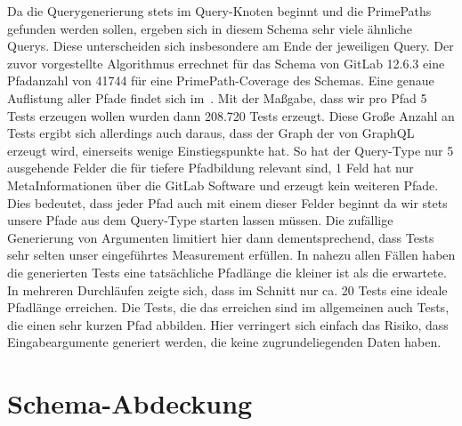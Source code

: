 Da die Querygenerierung stets im Query-Knoten beginnt und die PrimePaths gefunden werden sollen, ergeben sich in diesem
Schema sehr viele ähnliche Querys.
Diese unterscheiden sich insbesondere am Ende der jeweiligen Query.
Der zuvor vorgestellte Algorithmus errechnet für das Schema von GitLab 12.6.3 eine Pfadanzahl von 41744 für eine
PrimePath-Coverage des Schemas.
Eine genaue Auflistung aller Pfade findet sich im~\cite[GitHub]{gitlabpaths}.
Mit der Maßgabe, dass wir pro Pfad 5 Tests erzeugen wollen wurden dann 208.720 Tests erzeugt.
Diese Große Anzahl an Tests ergibt sich allerdings auch daraus, dass der Graph der von
GraphQL erzeugt wird, einerseits wenige Einstiegspunkte hat.
So hat der Query-Type nur 5 ausgehende Felder die für tiefere Pfadbildung relevant sind, 1 Feld hat nur MetaInformationen über
die GitLab Software und erzeugt kein weiteren Pfade.
Dies bedeutet, dass jeder Pfad auch mit einem dieser Felder beginnt da wir stets
unsere Pfade aus dem Query-Type starten lassen müssen.
Die zufällige Generierung von Argumenten limitiert hier dann dementsprechend, dass Tests sehr selten unser
eingeführtes Measurement erfüllen.
In nahezu allen Fällen haben die generierten Tests eine tatsächliche Pfadlänge die kleiner ist als die erwartete.
In mehreren Durchläufen zeigte sich, dass im Schnitt nur ca. 20 Tests eine ideale Pfadlänge erreichen.
Die Tests, die das erreichen sind im allgemeinen auch Tests, die einen sehr kurzen Pfad abbilden.
Hier verringert sich einfach das Risiko, dass Eingabeargumente generiert werden, die keine zugrundeliegenden Daten haben.









































\section{Schema-Abdeckung}

